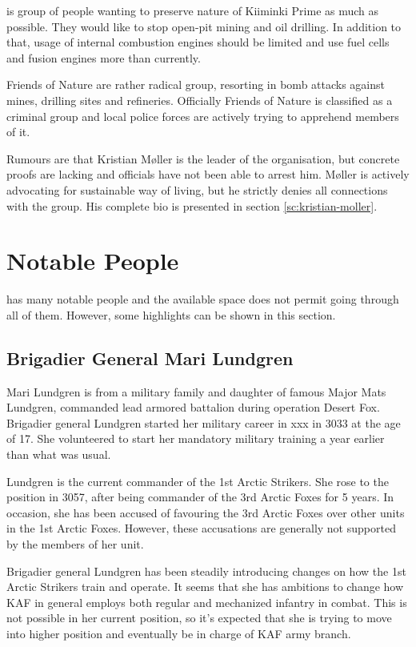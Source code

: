 \documentclass{tufte-book}
\begin{document}
 is group of people wanting to preserve nature
of Kiiminki Prime as much as possible. They would like to stop open-pit mining
and oil drilling. In addition to that, usage of internal combustion engines
should be limited and use fuel cells and fusion engines more than currently.

Friends of Nature are rather radical group, resorting in bomb attacks against
mines, drilling sites and refineries. Officially Friends of Nature is
classified as a criminal group and local police forces are actively trying to
apprehend members of it.

Rumours are that Kristian M\o ller is the leader of the organisation, but
concrete proofs are lacking and officials have not been able to arrest him.
M\o ller is actively advocating for sustainable way of living, but he
strictly denies all connections with the group. His complete bio is presented
in section \ref{sc:kristian-moller}.

\section{Notable People}
\label{sc:notable-people}

 has many notable people and the available
space does not permit going through all of them. However, some highlights
can be shown in this section.

\subsection{Brigadier General Mari Lundgren}
\label{sc:bio-mari-lundgren}

 Mari Lundgren is from a military family and
daughter of famous Major Mats Lundgren, commanded lead armored battalion during
operation Desert Fox. Brigadier general Lundgren started her military career
in xxx in 3033 at the age of 17. She volunteered to start her mandatory
military training a year earlier than what was usual.

Lundgren is the current commander of the
1st Arctic Strikers. She rose to the position in 3057, after being commander of
the 3rd Arctic Foxes for 5 years. In occasion, she has been accused of
favouring the 3rd Arctic Foxes over other units in the 1st Arctic Foxes.
However, these accusations are generally not supported by the members of her
unit.

Brigadier general Lundgren has been steadily introducing changes on how the
1st Arctic Strikers train and operate. It seems that she has ambitions to
change how KAF in general employs both regular and mechanized infantry in
combat. This is not possible in her current position, so it's expected that
she is trying to move into higher position and eventually be in charge of
KAF army branch.
\end{document}
